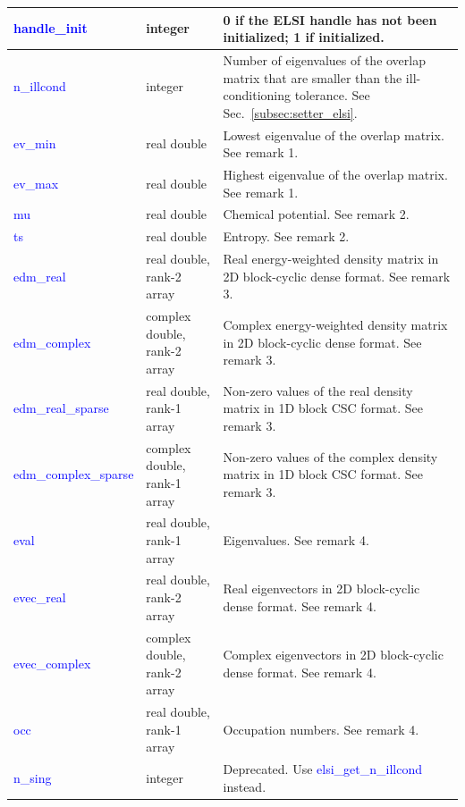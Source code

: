 \documentclass{report}
\newcommand{\tcb}[1]{\textcolor{blue}{#1}}
\begin{document}
\begin{longtable}[]{|p{30mm}|p{45mm}|p{90mm}|}
\hline
\tcb{handle\_init}         & integer                      & 0 if the ELSI handle has not been initialized; 1 if initialized.\\
\hline
\tcb{n\_illcond}           & integer                      & Number of eigenvalues of the overlap matrix that are smaller than the ill-conditioning tolerance. See Sec.~\ref{subsec:setter_elsi}.\\
\hline
\tcb{ev\_min}              & real double                  & Lowest eigenvalue of the overlap matrix. See remark 1.\\
\hline
\tcb{ev\_max}              & real double                  & Highest eigenvalue of the overlap matrix. See remark 1.\\
\hline
\tcb{mu}                   & real double                  & Chemical potential. See remark 2.\\
\hline
\tcb{ts}                   & real double                  & Entropy. See remark 2.\\
\hline
\tcb{edm\_real}            & real double, rank-2 array    & Real energy-weighted density matrix in 2D block-cyclic dense format. See remark 3.\\
\hline
\tcb{edm\_complex}         & complex double, rank-2 array & Complex energy-weighted density matrix in 2D block-cyclic dense format. See remark 3.\\
\hline
\tcb{edm\_real\_sparse}    & real double, rank-1 array    & Non-zero values of the real density matrix in 1D block CSC format. See remark 3.\\
\hline
\tcb{edm\_complex\_sparse} & complex double, rank-1 array & Non-zero values of the complex density matrix in 1D block CSC format. See remark 3.\\
\hline
\tcb{eval}                 & real double, rank-1 array    & Eigenvalues. See remark 4.\\
\hline
\tcb{evec\_real}           & real double, rank-2 array    & Real eigenvectors in 2D block-cyclic dense format. See remark 4.\\
\hline
\tcb{evec\_complex}        & complex double, rank-2 array & Complex eigenvectors in 2D block-cyclic dense format. See remark 4.\\
\hline
\tcb{occ}                  & real double, rank-1 array    & Occupation numbers. See remark 4.\\
\hline
\tcb{n\_sing}              & integer                      & Deprecated. Use \tcb{elsi\_get\_n\_illcond} instead.\\
\hline
\end{longtable}
\end{document}
